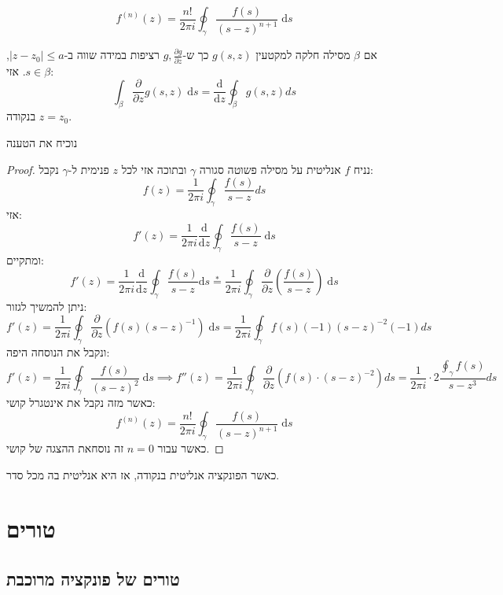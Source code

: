 \documentclass{tstextbook}
\begin{document}
\begin{proposition}
$$f^{(n)}(z)=\frac{n!}{2\pi i} \oint_{\gamma} \frac{f(s)}{(s-z)^{n+1}}\;\mathrm{d}s$$

\end{proposition}
\begin{lemma}
אם \(\beta\) מסילה חלקה למקטעין \(g(s,z)\) כך ש-\(g,\frac{\partial g}{\partial z}\) רציפות במידה שווה ב-\(\lvert z-z_{0} \rvert\leq a\), \(s \in \beta\). אזי:
$$\int_{\beta} \frac{\partial }{\partial z} g(s,z)\;\mathrm{d}s = \frac{\mathrm{d} }{\mathrm{d} z} \oint_{\beta}g(s,z)ds$$
בנקודה \(z=z_{0}\).

\end{lemma}
נוכיח את הטענה

\begin{proof}
נניח \(f\) אנליטית על מסילה פשוטה סגורה \(\gamma\) ובתוכה אזי לכל \(z\) פנימית ל-\(\gamma\) נקבל:
$$f(z)=\frac{1}{2\pi i}\oint_{\gamma} \frac{f(s)}{s-z}ds$$
אזי:
$$f'(z)=\frac{1}{2\pi i} \frac{\mathrm{d} }{\mathrm{d} z} \oint_{\gamma} \frac{f(s)}{s-z}\;\mathrm{d}s$$
ומתקיים:
$$f'(z)=\frac{1}{2\pi i}\frac{\mathrm{d} }{\mathrm{d} z} \oint_{\gamma}\frac{f(s)}{s-z}\mathrm{d}s\overset{*}{=} \frac{1}{2\pi i}\oint_{\gamma}\frac{\partial }{\partial z} \left( \frac{f(s)}{s-z} \right)\;\mathrm{d}s$$
ניתן להמשיך לגזור:
$$f'(z)=\frac{1}{2\pi i}\oint_{\gamma} \frac{\partial }{\partial z} (f(s)(s-z)^{-1})\;\mathrm{d}s = \frac{1}{2\pi i} \oint_{\gamma}f(s) (-1)(s-z)^{-2}(-1)ds$$
ונקבל את הנוסחה היפה:
$$f'(z)=\frac{1}{2\pi i}\oint_{\gamma} \frac{f(s)}{(s-z)^2}\;\mathrm{d}s \implies f''(z)=\frac{1}{2\pi i}\oint_{\gamma} \frac{\partial }{\partial z} \left( f(s)\cdot(s-z)^{-2} \right)ds=\frac{1}{2\pi i}\cdot 2 \frac{\oint_{\gamma}f(s)}{s-z^3}ds$$
כאשר מזה נקבל את אינטגרל קושי:
$$\boxed{f^{(n)}(z)=\frac{n!}{2\pi i} \oint_{\gamma} \frac{f(s)}{(s-z)^{n+1}}\;\mathrm{d}s}
$$
כאשר עבור \(n=0\) זה נוסחאת ההצגה של קושי.

\end{proof}
\begin{corollary}
כאשר הפונקציה אנליטית בנקודה, אז היא אנליטית בה מכל סדר.

\end{corollary}
\section{טורים}

\subsection{טורים של פונקציה מרוכבת}
\end{document}
